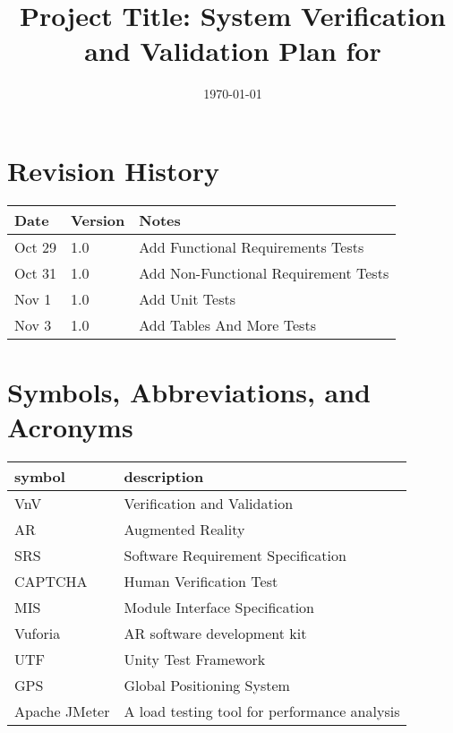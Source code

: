 \documentclass[12pt, titlepage]{article}
\begin{document}
\title{Project Title: System Verification and Validation Plan for \progname{}} 
\author{\authname}
\date{\today}
	
\maketitle


\section*{Revision History}

\begin{tabularx}{\textwidth}{p{3cm}p{2cm}X}
\toprule {\bf Date} & {\bf Version} & {\bf Notes}\\
\midrule
Oct 29 & 1.0 & Add Functional Requirements Tests\\
Oct 31 & 1.0 & Add Non-Functional Requirement Tests\\
Nov 1 & 1.0 & Add Unit Tests\\
Nov 3 & 1.0 & Add Tables And More Tests\\
\bottomrule
\end{tabularx}

\newpage

\tableofcontents

\listoftables

\newpage

\section{Symbols, Abbreviations, and Acronyms}

\renewcommand{\arraystretch}{1.2}
\begin{tabular}{l l} 
  \toprule		
  \textbf{symbol} & \textbf{description}\\
  \midrule 
  VnV & Verification and Validation\\
  \midrule
  AR & Augmented Reality\\
  \midrule
  SRS & Software Requirement Specification\\
  \midrule
  CAPTCHA & Human Verification Test\\
  \midrule
  MIS & Module Interface Specification\\
  \midrule
  Vuforia & AR software development kit\\
  \midrule
  UTF & Unity Test Framework\\
  \midrule
  GPS & Global Positioning System\\
  \midrule
  Apache JMeter & A load testing tool for performance analysis\\
  \bottomrule
\end{tabular}\\
\end{document}

